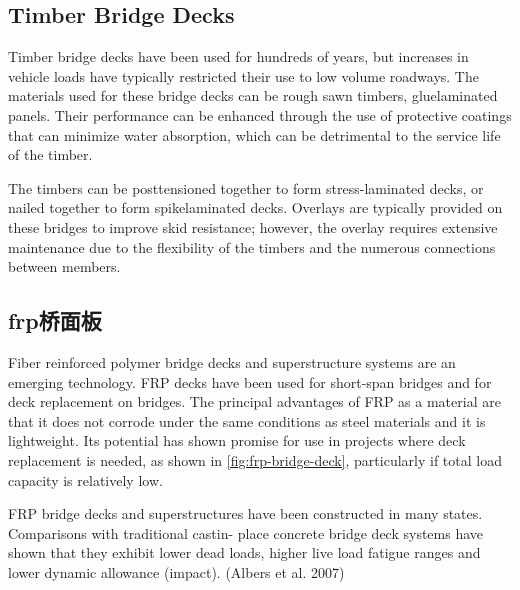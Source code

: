 \subsection{Timber Bridge Decks}

Timber bridge decks have been used for hundreds of years, but increases in vehicle loads have typically restricted their use to low volume roadways. The materials used for these bridge decks can be rough sawn timbers, gluelaminated panels. Their performance can be enhanced through the use of protective coatings that can minimize water absorption, which can be detrimental to the service life of the timber.

The timbers can be posttensioned together to form stress-laminated decks, or nailed together to form spikelaminated decks. Overlays are typically provided on these bridges to improve skid resistance; however, the overlay requires extensive maintenance due to the flexibility of the timbers and the numerous connections between members.

\subsection{\texorpdfstring{\acrlong*{frp}}{FRP}桥面板}

Fiber reinforced polymer bridge decks and superstructure systems are an emerging technology. FRP decks have been used for short-span bridges and for deck replacement on bridges. The principal advantages of FRP as a material are that it does not corrode under the same conditions as steel materials and it is lightweight. Its potential has shown promise for use in projects where deck replacement is needed, as shown in \cref{fig:frp-bridge-deck}, particularly if total load capacity is relatively low.

FRP bridge decks and superstructures have been constructed in many states. Comparisons with traditional castin- place concrete bridge deck systems have shown that they exhibit lower dead loads, higher live load fatigue ranges and lower dynamic allowance (impact). (Albers et al. 2007)

